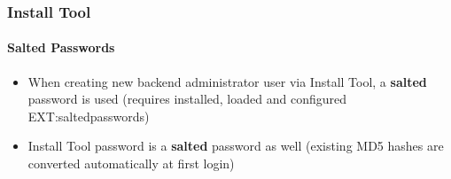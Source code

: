 \begin{frame}[fragile]
\end{frame}


\begin{frame}[fragile]
	\frametitle{Install Tool}
	\framesubtitle{Salted Passwords}

	\begin{itemize}
		\item When creating new backend administrator user via Install Tool,\newline
			a \textbf{salted} password is used\newline
			\smaller(requires installed, loaded and configured EXT:saltedpasswords)\normalsize
		\item Install Tool password is a \textbf{salted} password as well\newline
			\smaller(existing MD5 hashes are converted automatically at first login)\normalsize
	\end{itemize}


\end{frame}

